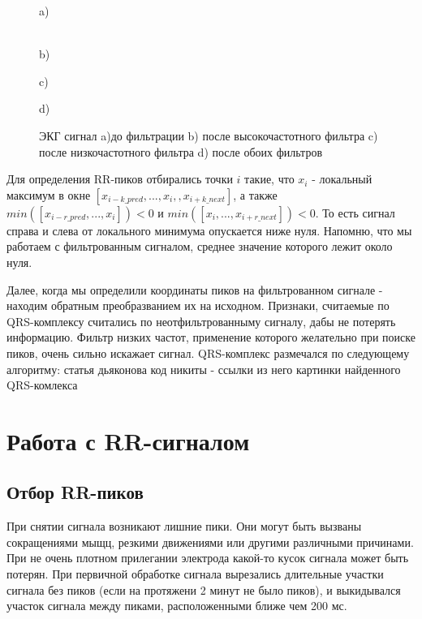 \begin{figure}[h]
	\begin{minipage}[h]{0.47\linewidth}
		 a) \\
	\end{minipage}
	\hfill
	\begin{minipage}[h]{0.47\linewidth}
		 \\b)
	\end{minipage}
	\vfill
	\begin{minipage}[h]{0.47\linewidth}
		 c) \\
	\end{minipage}
	\hfill
	\begin{minipage}[h]{0.47\linewidth}
		 d) \\
	\end{minipage}
	\caption{ЭКГ сигнал a)до фильтрации b) после высокочастотного фильтра
		c) после низкочастотного фильтра d) после обоих фильтров}
	\label{ris:filter_ekg}
\end{figure}

Для определения RR-пиков отбирались точки $i$ такие, что $x_i$ - локальный максимум в окне $[x_{i-k\_pred}, ..., x_i,    , x_{i+k\_next}]$, а также $min([x_{i-r\_pred}, ..., x_i])<0$ и $min([x_i, ..., x_{i+r\_next}])<0$. То есть сигнал справа и слева от локального минимума опускается ниже нуля. Напомню, что мы работаем с фильтрованным сигналом, среднее значение которого лежит около нуля.

Далее, когда мы определили координаты пиков на фильтрованном сигнале - находим обратным преобразванием их на исходном. Признаки, считаемые по QRS-комплексу считались по неотфильтрованныму сигналу, дабы не потерять информацию. Фильтр низких частот, применение которого желательно при поиске пиков, очень сильно искажает сигнал. 
QRS-комплекс размечался по следующему алгоритму:
статья дьяконова
код никиты - ссылки из него
картинки найденного QRS-комлекса

\section{Работа с RR-сигналом}
\subsection{Отбор RR-пиков}
При снятии сигнала возникают лишние пики. Они могут быть вызваны сокращениями мыщц, резкими движениями или другими различными причинами. При не очень плотном прилегании электрода какой-то кусок сигнала может быть потерян. При первичной обработке сигнала вырезались длительные участки сигнала без пиков (если на протяжени 2 минут не было пиков), и выкидывался участок сигнала между пиками, расположенными ближе чем 200 мс.

